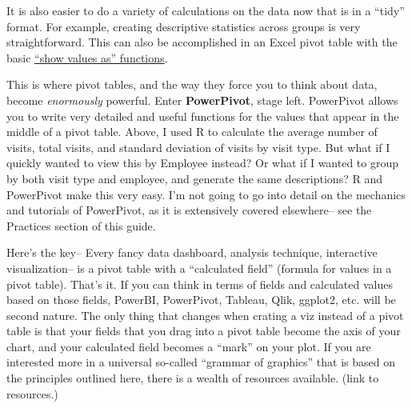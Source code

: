 \documentclass[]{book}
\newenvironment{Shaded}{\begin{snugshade}}{\end{snugshade}}
\newcommand{\DataTypeTok}[1]{\textcolor[rgb]{0.13,0.29,0.53}{#1}}
\newcommand{\KeywordTok}[1]{\textcolor[rgb]{0.13,0.29,0.53}{\textbf{#1}}}
\newcommand{\NormalTok}[1]{#1}
\newcommand{\OperatorTok}[1]{\textcolor[rgb]{0.81,0.36,0.00}{\textbf{#1}}}
\newcommand{\StringTok}[1]{\textcolor[rgb]{0.31,0.60,0.02}{#1}}
\begin{document}
It is also easier to do a variety of calculations on the data now that is in a ``tidy'' format. For example, creating descriptive statistics across groups is very straightforward. This can also be accomplished in an Excel pivot table with the basic \href{https://support.microsoft.com/en-gb/office/show-different-calculations-in-pivottable-value-fields-014d2777-baaf-480b-a32b-98431f48bfec}{``show values as'' functions}.

\begin{Shaded}
\end{Shaded}

This is where pivot tables, and the way they force you to think about data, become \emph{enormously} powerful. Enter \textbf{PowerPivot}, stage left. PowerPivot allows you to write very detailed and useful functions for the values that appear in the middle of a pivot table. Above, I used R to calculate the average number of visits, total visits, and standard deviation of visits by visit type. But what if I quickly wanted to view this by Employee instead? Or what if I wanted to group by both visit type and employee, and generate the same descriptions? R and PowerPivot make this very easy. I'm not going to go into detail on the mechanics and tutorials of PowerPivot, as it is extensively covered elsewhere-- see the Practices section of this guide.

Here's the key-- Every fancy data dashboard, analysis technique, interactive visualization-- is a pivot table with a ``calculated field'' (formula for values in a pivot table). That's it. If you can think in terms of fields and calculated values based on those fields, PowerBI, PowerPivot, Tableau, Qlik, ggplot2, etc. will be second nature. The only thing that changes when crating a viz instead of a pivot table is that your fields that you drag into a pivot table become the axis of your chart, and your calculated field becomes a ``mark'' on your plot. If you are interested more in a universal so-called ``grammar of graphics'' that is based on the principles outlined here, there is a wealth of resources available. (link to resources.)
\end{document}
